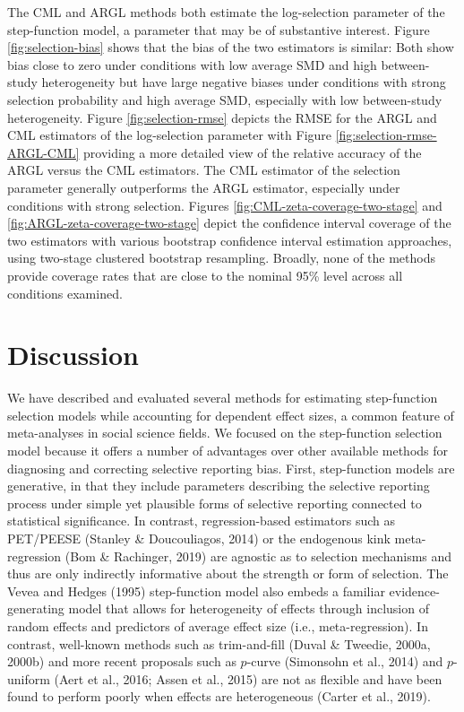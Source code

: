 \documentclass[
  american,
  man, donotrepeattitle,floatsintext]{apa7}
\begin{document}
The CML and ARGL methods both estimate the log-selection parameter of the step-function model, a parameter that may be of substantive interest.
Figure \ref{fig:selection-bias} shows that the bias of the two estimators is similar: Both show bias close to zero under conditions with low average SMD and high between-study heterogeneity but have large negative biases under conditions with strong selection probability and high average SMD, especially with low between-study heterogeneity.
Figure \ref{fig:selection-rmse} depicts the RMSE for the ARGL and CML estimators of the log-selection parameter with Figure \ref{fig:selection-rmse-ARGL-CML} providing a more detailed view of the relative accuracy of the ARGL versus the CML estimators.
The CML estimator of the selection parameter generally outperforms the ARGL estimator, especially under conditions with strong selection.
Figures \ref{fig:CML-zeta-coverage-two-stage} and \ref{fig:ARGL-zeta-coverage-two-stage} depict the confidence interval coverage of the two estimators with various bootstrap confidence interval estimation approaches, using two-stage clustered bootstrap resampling.
Broadly, none of the methods provide coverage rates that are close to the nominal 95\% level across all conditions examined.

\section{Discussion}\label{discussion}

We have described and evaluated several methods for estimating step-function selection models while accounting for dependent effect sizes, a common feature of meta-analyses in social science fields.
We focused on the step-function selection model because it offers a number of advantages over other available methods for diagnosing and correcting selective reporting bias.
First, step-function models are generative, in that they include parameters describing the selective reporting process under simple yet plausible forms of selective reporting connected to statistical significance.
In contrast, regression-based estimators such as PET/PEESE (Stanley \& Doucouliagos, 2014) or the endogenous kink meta-regression (Bom \& Rachinger, 2019) are agnostic as to selection mechanisms and thus are only indirectly informative about the strength or form of selection.
The Vevea and Hedges (1995) step-function model also embeds a familiar evidence-generating model that allows for heterogeneity of effects through inclusion of random effects and predictors of average effect size (i.e., meta-regression).
In contrast, well-known methods such as trim-and-fill (Duval \& Tweedie, 2000a, 2000b) and more recent proposals such as \(p\)-curve (Simonsohn et al., 2014) and \(p\)-uniform (Aert et al., 2016; Assen et al., 2015) are not as flexible and have been found to perform poorly when effects are heterogeneous (Carter et al., 2019).
\end{document}
